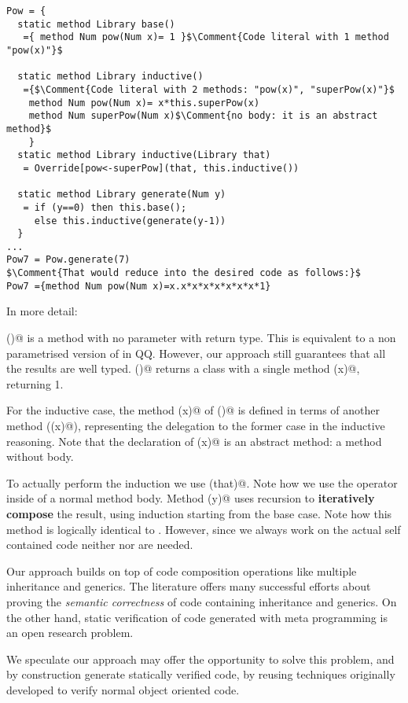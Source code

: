 \begin{lstlisting}
Pow = {
  static method Library base()
   ={ method Num pow(Num x)= 1 }$\Comment{Code literal with 1 method "pow(x)"}$

  static method Library inductive()
   ={$\Comment{Code literal with 2 methods: "pow(x)", "superPow(x)"}$
    method Num pow(Num x)= x*this.superPow(x)
    method Num superPow(Num x)$\Comment{no body: it is an abstract method}$
    }
  static method Library inductive(Library that)
   = Override[pow<-superPow](that, this.inductive())
  
  static method Library generate(Num y)
   = if (y==0) then this.base();
     else this.inductive(generate(y-1))
  }
...
Pow7 = Pow.generate(7)
$\Comment{That would reduce into the desired code as follows:}$
Pow7 ={method Num pow(Num x)=x.x*x*x*x*x*x*x*1}
\end{lstlisting}

\noindent In more detail:

\Q@base()@ is a method with no parameter with \Q@Library@ return type.
This is equivalent to a non parametrised version of \Q@Expr@ in QQ.
However, our approach still guarantees that all the results are well typed.
\Q@base()@ returns a class with a single method \Q@pow(x)@,
returning 1.

For the inductive case, the method \Q@pow(x)@ of \Q@inductive()@ is defined in terms of
another method (\Q@superPow(x)@), representing the delegation to
the former case in the inductive reasoning.
Note that the declaration of \Q@superPow(x)@ is an abstract method: a method without body.

To actually perform the induction we use \Q@inductive(that)@.
Note how we use the operator \Q@Override@ inside of a normal method body.
Method \Q@generate(y)@ uses recursion to \textbf{iteratively compose} the result, using induction starting from
the base case.
Note how this method is logically identical to \Q@powerAux@. However,
since we always work on the actual self contained code neither \Q@lambdaX@ nor \Q@compile@ are needed.

Our approach builds on top of code composition operations like multiple inheritance and generics.
The literature offers \cite{barnett2004spec,burdy2005overview,muller2016viper} many successful efforts about proving the
\emph{semantic correctness} 
of code containing inheritance and generics.
On the other hand, static verification of code generated with meta programming is an open research problem.

We speculate our approach may offer the opportunity to solve this problem,
and by construction generate statically verified code,
by reusing techniques originally developed to verify normal object oriented code.


